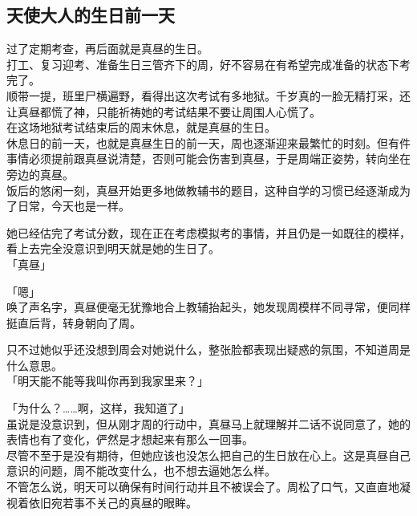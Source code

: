 \subsection{天使大人的生日前一天}

过了定期考查，再后面就是真昼的生日。\\

打工、复习迎考、准备生日三管齐下的周，好不容易在有希望完成准备的状态下考完了。\\

顺带一提，班里尸横遍野，看得出这次考试有多地狱。千岁真的一脸无精打采，还让真昼都慌了神，只能祈祷她的考试结果不要让周围人心慌了。\\

在这场地狱考试结束后的周末休息，就是真昼的生日。\\

休息日的前一天，也就是真昼生日的前一天，周也逐渐迎来最繁忙的时刻。但有件事情必须提前跟真昼说清楚，否则可能会伤害到真昼，于是周端正姿势，转向坐在旁边的真昼。\\

饭后的悠闲一刻，真昼开始更多地做教辅书的题目，这种自学的习惯已经逐渐成为了日常，今天也是一样。

她已经估完了考试分数，现在正在考虑模拟考的事情，并且仍是一如既往的模样，看上去完全没意识到明天就是她的生日了。\\

「真昼」

「嗯」\\

唤了声名字，真昼便毫无犹豫地合上教辅抬起头，她发现周模样不同寻常，便同样挺直后背，转身朝向了周。

只不过她似乎还没想到周会对她说什么，整张脸都表现出疑惑的氛围，不知道周是什么意思。\\

「明天能不能等我叫你再到我家里来？」

「为什么？……啊，这样，我知道了」\\

虽说是没意识到，但从刚才周的行动中，真昼马上就理解并二话不说同意了，她的表情也有了变化，俨然是才想起来有那么一回事。\\

尽管不至于是没有期待，但她应该也没怎么把自己的生日放在心上。这是真昼自己意识的问题，周不能改变什么，也不想去逼她怎么样。\\

不管怎么说，明天可以确保有时间行动并且不被误会了。周松了口气，又直直地凝视着依旧宛若事不关己的真昼的眼眸。\\

